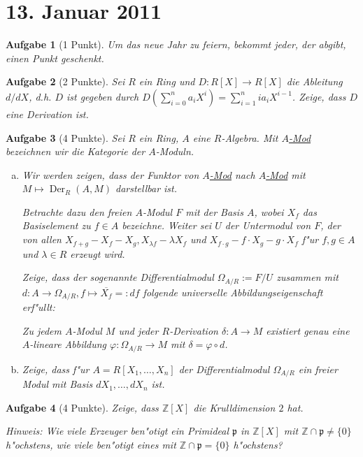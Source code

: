 \documentclass[a4paper, 12pt, numbers=noendperiod, chapterprefix=true, headsepline]{scrbook}
\theoremstyle{break}
\newtheorem{Aufg}{Aufgabe}
\theoremstyle{nonumberbreak}
\theoremstyle{nonumberplain}
\DeclareMathOperator{\Der}{Der}
\newcommand{\Z}{\mathbb{Z}}
\newcommand{\p}{\mathfrak{p}}
\begin{document}
\newpage
\section{13. Januar 2011}
\setcounter{Aufg}{-1}
\setcounter{Loes}{2}

\begin{Aufg}[1 Punkt]
Um das neue Jahr zu feiern, bekommt jeder, der abgibt, einen Punkt geschenkt.
\end{Aufg}

\begin{Aufg}[2 Punkte]
Sei $R$ ein Ring und $D\colon R[X] \to R[X]$ die Ableitung $d/dX$, d.h. $D$ ist gegeben durch $D(\sum_{i=0}^n a_i X^i) = \sum_{i=1}^n i a_i X^{i-1}$. Zeige, dass $D$ eine Derivation ist.
\end{Aufg}

\begin{Aufg}[4 Punkte]
Sei $R$ ein Ring, $A$ eine $R$-Algebra. Mit \underline{$A$-Mod} bezeichnen wir die Kategorie der $A$-Moduln.
\begin{enumerate}[a)]
\item
	Wir werden zeigen, dass der Funktor von \underline{$A$-Mod} nach \underline{$A$-Mod} mit $M \mapsto \Der_R(A,M)$ darstellbar ist.

	Betrachte dazu den freien $A$-Modul $F$ mit der Basis $A$, wobei $X_f$ das Basiselement zu $f \in A$ bezeichne. Weiter sei $U$ der Untermodul von $F$, der von allen $X_{f+g} - X_f - X_g, X_{\lambda f} - \lambda X_f$ und $X_{f \cdot g} - f \cdot X_g - g \cdot X_f$ f"ur $f,g \in A$ und $\lambda \in R$ erzeugt wird. 

	Zeige, dass der sogenannte \emph{Differentialmodul} $\Omega_{A/R} := F/U$ zusammen mit $d \colon A \to \Omega_{A/R}, f \mapsto \overline{X_f} =: df$ folgende universelle Abbildungseigenschaft erf"ullt:

	Zu jedem $A$-Modul $M$ und jeder $R$-Derivation $\delta\colon A \to M$ existiert genau eine $A$-lineare Abbildung $\varphi \colon \Omega_{A/R} \to M$ mit $\delta = \varphi \circ d$.
\item
	Zeige, dass f"ur $A= R[X_1, \dots, X_n]$ der Differentialmodul $\Omega_{A/R}$ ein freier Modul mit Basis $dX_1, \dots, dX_n$ ist.
\end{enumerate}\end{Aufg}

\begin{Aufg}[4 Punkte]
Zeige, dass $\Z[X]$ die Krulldimension $2$ hat.

\emph{Hinweis: Wie viele Erzeuger ben"otigt ein Primideal $\p$ in $\Z[X]$ mit $\Z \cap \p \neq \{0\}$ h"ochstens, wie viele ben"otigt eines mit $\Z \cap \p = \{0\}$ h"ochstens?}
\end{Aufg}
\end{document}
